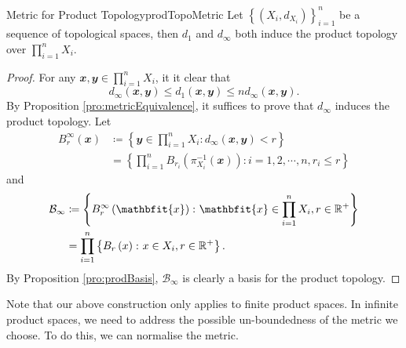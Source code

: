 \documentclass[math]{amznotes}
\theoremstyle{remark}
\begin{document}
\begin{probox}{Metric for Product Topology}{prodTopoMetric}
    Let $\left\{\left(X_i, d_{X_i}\right)\right\}_{i = 1}^n$ be a sequence of topological spaces, then $d_1$ and $d_{\infty}$ both induce the product topology over $\prod_{i = 1}^nX_i$.
    \tcblower
    \begin{proof}
        For any $\mathbfit{x}, \mathbfit{y} \in \prod_{i = 1}^nX_i$, it it clear that 
        \begin{equation*}
            d_{\infty}\left(\mathbfit{x}, \mathbfit{y}\right) \leq d_1\left(\mathbfit{x}, \mathbfit{y}\right) \leq nd_{\infty}\left(\mathbfit{x}, \mathbfit{y}\right).
        \end{equation*}
        By Proposition \ref{pro:metricEquivalence}, it suffices to prove that $d_{\infty}$ induces the product topology. Let 
        \begin{align*}
            B_r^{\infty}\left(\mathbfit{x}\right) & \coloneqq \left\{\mathbfit{y} \in \prod_{i = 1}^nX_i \colon d_{\infty}\left(\mathbfit{x}, \mathbfit{y}\right) < r\right\} \\
            & = \left\{\prod_{i = 1}^nB_{r_i}\left(\pi_{X_i}^{-1}\left(\mathbfit{x}\right)\right) \colon i = 1, 2, \cdots, n, r_i \leq r\right\}
        \end{align*}
        and
        \begin{align*}
            \mathcal{B}_{\infty} & \coloneqq \left\{B_r^{\infty}\left(\mathbfit{x}\right) \colon \mathbfit{x} \in \prod_{i = 1}^nX_i, r \in \R^+ \right\} \\
            & = \prod_{i = 1}^n\left\{B_r\left(x\right) \colon x \in X_i, r \in \R^+\right\}.
        \end{align*}
        By Proposition \ref{pro:prodBasis}, $\mathcal{B}_{\infty}$ is clearly a basis for the product topology.
    \end{proof}
\end{probox}
Note that our above construction only applies to finite product spaces. In infinite product spaces, we need to address the possible un-boundedness of the metric we choose. To do this, we can normalise the metric.
\end{document}
